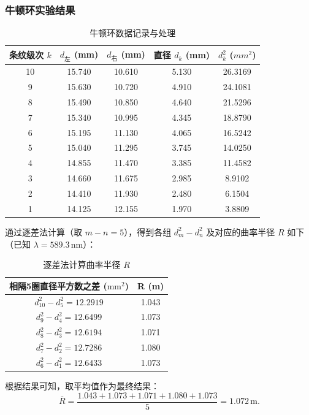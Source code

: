 \documentclass[]{../template/Report}%
\begin{document}
\begin{fullreportonly}
\subsubsection{牛顿环实验结果}
\begin{table}[H]
  \centering
  \caption{牛顿环数据记录与处理}
  \begin{tabular}{ccccc}
    \toprule
    条纹级次 $k$ & $d_{\text{左}}$ (mm) & $d_{\text{右}}$ (mm) & 直径 $d_k$ (mm) & $d_k^2$ ($mm^2$) \\
    \midrule
    10 & 15.740 & 10.610 & 5.130 & 26.3169 \\
    9  & 15.630 & 10.720 & 4.910 & 24.1081 \\
    8  & 15.490 & 10.850 & 4.640 & 21.5296 \\
    7  & 15.340 & 10.995 & 4.345 & 18.8790 \\
    6  & 15.195 & 11.130 & 4.065 & 16.5242 \\
    5  & 15.040 & 11.295 & 3.745 & 14.0250 \\
    4  & 14.855 & 11.470 & 3.385 & 11.4582 \\
    3  & 14.660 & 11.675 & 2.985 & 8.9102 \\
    2  & 14.410 & 11.930 & 2.480 & 6.1504 \\
    1  & 14.125 & 12.155 & 1.970 & 3.8809 \\
    \bottomrule
  \end{tabular}
\end{table}
通过逐差法计算（取 $m-n=5$），得到各组 $d_m^2 - d_n^2$ 及对应的曲率半径 $R$ 如下（已知 $\lambda = 589.3\,\text{nm}$）：
\begin{table}[H]
  \centering
  \caption{逐差法计算曲率半径 $R$}
  \begin{tabular}{cc}
    \toprule
    \textbf{相隔5圈直径平方数之差} ($\text{mm}^2$) & \textbf{R} (m) \\
    \midrule
    $d_{10}^2 - d_5^2 = 12.2919$ & 1.043 \\
    $d_{9}^2 - d_4^2 = 12.6499$ & 1.073 \\
    $d_{8}^2 - d_3^2 = 12.6194$ & 1.071 \\
    $d_{7}^2 - d_2^2 = 12.7286$ & 1.080 \\
    $d_{6}^2 - d_1^2 = 12.6433$ & 1.073 \\
    \bottomrule
  \end{tabular}
\end{table}
根据结果可知，取平均值作为最终结果：
\[\overline{R} = \frac{1.043+1.073+1.071+1.080+1.073}{5} =1.072 \,\text{m}.\]




\end{fullreportonly}
\end{document}
